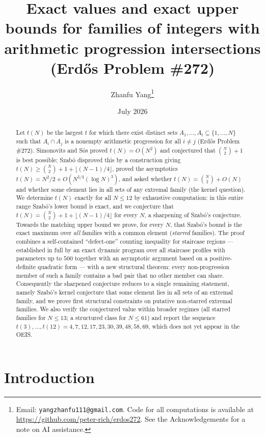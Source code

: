 \documentclass[11pt]{article}
\title{Exact values and exact upper bounds for families of integers with arithmetic progression intersections\\ \large (Erd\H{o}s Problem \#272)}
\author{Zhanfu Yang\thanks{Email: \texttt{yangzhanfu111@gmail.com}. Code for all computations is available at \url{https://github.com/peter-rich/erdos272}. See the Acknowledgements for a note on AI assistance.}}
\date{July 2026}
\theoremstyle{definition}
\begin{document}
\maketitle

\begin{abstract}
Let $t(N)$ be the largest $t$ for which there exist distinct sets $A_1,\dots,A_t\subseteq\{1,\dots,N\}$ such that $A_i\cap A_j$ is a nonempty arithmetic progression for all $i\neq j$ (Erd\H{o}s Problem \#272). Simonovits and S\'os proved $t(N)=O(N^2)$ and conjectured that $\binom N2+1$ is best possible; Szab\'o disproved this by a construction giving $t(N)\ge\binom N2+1+\lfloor(N-1)/4\rfloor$, proved the asymptotics $t(N)=N^2/2+O(N^{5/3}(\log N)^3)$, and asked whether $t(N)=\binom N2+O(N)$ and whether some element lies in all sets of any extremal family (the kernel question). We determine $t(N)$ exactly for all $N\le 12$ by exhaustive computation: in this entire range Szab\'o's lower bound is exact, and we conjecture that $t(N)=\binom N2+1+\lfloor(N-1)/4\rfloor$ for every $N$, a sharpening of Szab\'o's conjecture. Towards the matching upper bound we prove, for every $N$, that Szab\'o's bound is the exact maximum over \emph{all} families with a common element (\emph{starred} families). The proof combines a self-contained ``defect-one'' counting inequality for staircase regions --- established in full by an exact dynamic program over all staircase profiles with parameters up to $500$ together with an asymptotic argument based on a positive-definite quadratic form --- with a new structural theorem: every non-progression member of such a family contains a bad pair that no other member can share. Consequently the sharpened conjecture reduces to a single remaining statement, namely Szab\'o's kernel conjecture that some element lies in all sets of an extremal family, and we prove first structural constraints on putative non-starred extremal families. We also verify the conjectured value within broader regimes (all starred families for $N\le13$; a structured class for $N\le61$) and report the sequence $t(3),\dots,t(12)=4,7,12,17,23,30,39,48,58,69$, which does not yet appear in the OEIS.
\end{abstract}

\section{Introduction}
\end{document}
